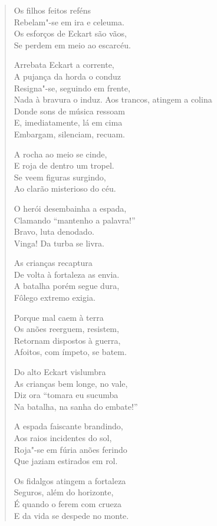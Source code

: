\begin{verse}
Os filhos feitos reféns\\
Rebelam"-se em ira e celeuma.\\
Os esforços de Eckart são vãos,\\
Se perdem em meio ao escarcéu.

Arrebata Eckart a corrente,\\
A pujança da horda o conduz\\
Resigna"-se, seguindo em frente,\\
Nada  à bravura o induz.
\pagebreak
Aos trancos, atingem a colina\\
Donde sons de música ressoam\\
E, imediatamente, lá em cima\\
Embargam, silenciam, recuam.

A rocha ao meio se cinde,\\
E roja de dentro um tropel.\\
Se veem figuras surgindo,\\
Ao clarão misterioso do céu.

O herói desembainha a espada,\\
Clamando ``mantenho a palavra!''\\
Bravo, luta denodado.\\
Vinga! Da turba se livra.
 
As crianças recaptura\\
De volta à fortaleza as envia.\\
A batalha porém segue dura,\\
Fôlego extremo exigia. 

Porque mal caem à terra\\
Os anões reerguem, resistem,\\
Retornam dispostos à guerra,\\
Afoitos, com ímpeto, se batem.

Do alto Eckart vislumbra\\
As crianças bem longe, no vale,\\
Diz ora ``tomara eu sucumba\\
Na batalha, na sanha do embate!''

A espada faiscante brandindo,\\
Aos raios incidentes do sol,\\
Roja"-se em fúria anões ferindo\\
Que jaziam estirados em rol.

Os fidalgos atingem a fortaleza\\
Seguros, além do horizonte,\\
É quando o ferem com crueza\\
E da vida se despede no monte.


\end{verse}
